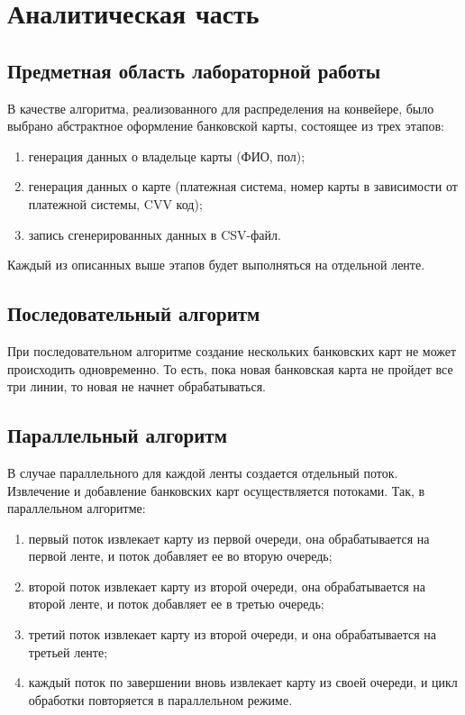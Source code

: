 \section{Аналитическая часть}

\subsection{Предметная область лабораторной работы}
В качестве алгоритма, реализованного для распределения на конвейере, было выбрано абстрактное оформление банковской карты, состоящее из трех этапов:
\begin{enumerate}[label*=---]
	\item генерация данных о владельце карты (ФИО,  пол);
	\item генерация данных о карте (платежная система, номер карты в зависимости от платежной системы, CVV код);
	\item запись сгенерированных данных в CSV-файл.
\end{enumerate}

Каждый из описанных выше этапов будет выполняться на отдельной ленте.

\subsection{Последовательный алгоритм}

При последовательном алгоритме создание нескольких банковских карт не может происходить одновременно. То есть,  пока новая банковская карта не пройдет все три линии, то новая не начнет обрабатываться.

\subsection{Параллельный алгоритм}

В случае параллельного для каждой ленты создается отдельный поток. Извлечение и добавление банковских карт осуществляется потоками. Так, в параллельном алгоритме:
\begin{enumerate}[label*=---]
	\item первый поток извлекает карту из первой очереди, она обрабатывается на первой ленте, и поток добавляет ее во вторую очередь;
	\item второй поток извлекает карту из второй очереди, она обрабатывается на второй ленте, и поток добавляет ее в третью очередь;
	\item третий поток извлекает карту из второй очереди, и она обрабатывается на третьей ленте;
	\item каждый поток по завершении вновь извлекает карту из своей очереди, и цикл обработки повторяется в параллельном режиме.
\end{enumerate}

